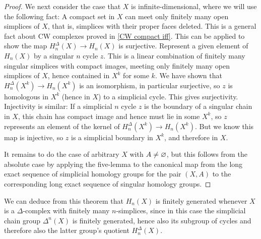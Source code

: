 \begin{proof}
We next consider the case that $X$ is infinite-dimensional, where we will use the following fact: A compact set in $X$ can meet only finitely many open simplices of $X$, that is, simplices with their proper faces deleted. This is a general fact about CW complexes proved in \cref{CW compact iff}. This can be applied to show the map $H^\Delta_n(X)\to H_n(X)$ is surjective.  Represent a given element of $H_n(X)$ by a singular $n$ cycle $z$. This is a linear combination of finitely many singular simplices with compact images, meeting only finitely many open simplices of $X$, hence contained in $X^k$ for some $k$. We have shown that $H^\Delta_n(X^k)\to H_n(X^k)$ is an isomorphism, in particular surjective, so $z$ is homologous in $X^k$ (hence in $X$) to a simplicial cycle. This gives surjectivity. Injectivity is similar: If a simplicial $n$ cycle $z$ is the boundary of a singular chain in $X$, this chain has compact image and hence must lie in some $X^k$, so $z$ represents an element of the kernel of $H^\Delta_n(X^k)\to H_n(X^k)$. But we know this map is injective, so $z$ is a simplicial boundary in $X^k$, and therefore in $X$.\par
It remains to do the case of arbitrary $X$ with $A\neq\varnothing$, but this follows from the absolute case by applying the five-lemma to the canonical map from the long exact sequence of simplicial homology groups for the pair $(X,A)$ to the corresponding long exact sequence of singular homology groups.
\end{proof}
We can deduce from this theorem that $H_n(X)$ is finitely generated whenever $X$
is a $\Delta$-complex with finitely many $n$-simplices, since in this case the simplicial chain group $\Delta^n(X)$ is finitely generated, hence also its subgroup of cycles and therefore also the latter group's quotient $H^\Delta_n(X)$.
